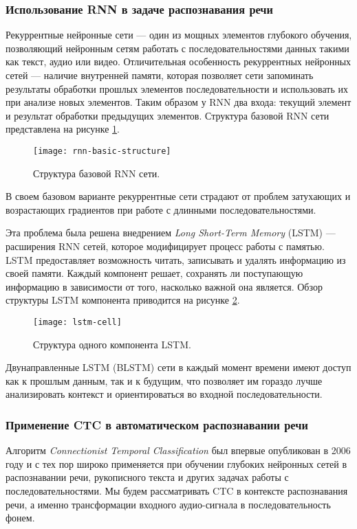 \subsubsection{Использование RNN в задаче распознавания речи}
Рекуррентные нейронные сети --- один из мощных элементов глубокого обучения, позволяющий нейронным сетям работать с последовательностями данных такими как текст, аудио или видео. Отличительная особенность рекуррентных нейронных сетей --- наличие внутренней памяти, которая позволяет сети запоминать результаты обработки прошлых элементов последовательности и использовать их при анализе новых элементов. Таким образом у RNN два входа: текущий элемент и результат обработки предыдущих элементов. Структура базовой RNN сети представлена на рисунке \ref{fig:rnn-basic-structure}.

\begin{figure}[h]
	\centering
	\texttt{[image: rnn-basic-structure]}
	\caption{Структура базовой RNN сети.}
	\label{fig:rnn-basic-structure}
\end{figure}

В своем базовом варианте рекуррентные сети страдают от проблем затухающих и возрастающих градиентов при работе с длинными последовательностями.

Эта проблема была решена внедрением \emph{Long Short-Term Memory} (LSTM)\cite{hochreiter1997long} --- расширения RNN сетей, которое модифицирует процесс работы с памятью. LSTM предоставляет возможность читать, записывать и удалять информацию из своей памяти. Каждый компонент решает, сохранять ли поступающую информацию в зависимости от того, насколько важной она является. Обзор структуры LSTM компонента приводится на рисунке \ref{fig:lstm-cell}.

\begin{figure}[h]
	\centering
	\texttt{[image: lstm-cell]}
	\caption{Структура одного компонента LSTM.}
	\label{fig:lstm-cell}
\end{figure}

Двунаправленные LSTM (BLSTM) сети\cite{graves2013speech, huang2015bidirectional} в каждый момент времени имеют доступ как к прошлым данным, так и к будущим, что позволяет им гораздо лучше анализировать контекст и ориентироваться во входной последовательности.

\subsubsection{Применение CTC в автоматическом распознавании речи}
Алгоритм \emph{Connectionist Temporal Classification} был впервые опубликован в 2006 году\cite{graves2006connectionist} и с тех пор широко применяется при обучении глубоких нейронных сетей в распознавании речи, рукописного текста и других задачах работы с последовательностями. Мы будем рассматривать CTC в контексте распознавания речи, а именно трансформации входного аудио-сигнала в последовательность фонем.

